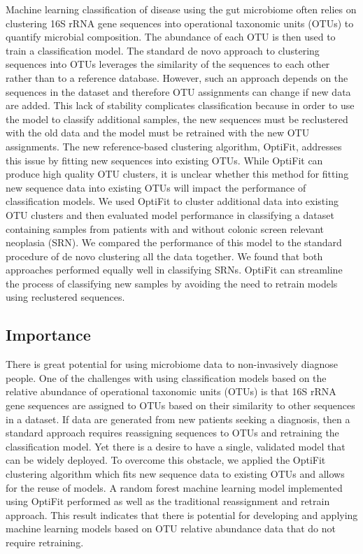 \documentclass[
]{article}
\begin{document}
Machine learning classification of disease using the gut microbiome
often relies on clustering 16S rRNA gene sequences into operational
taxonomic units (OTUs) to quantify microbial composition. The abundance
of each OTU is then used to train a classification model. The standard
de novo approach to clustering sequences into OTUs leverages the
similarity of the sequences to each other rather than to a reference
database. However, such an approach depends on the sequences in the
dataset and therefore OTU assignments can change if new data are added.
This lack of stability complicates classification because in order to
use the model to classify additional samples, the new sequences must be
reclustered with the old data and the model must be retrained with the
new OTU assignments. The new reference-based clustering algorithm,
OptiFit, addresses this issue by fitting new sequences into existing
OTUs. While OptiFit can produce high quality OTU clusters, it is unclear
whether this method for fitting new sequence data into existing OTUs
will impact the performance of classification models. We used OptiFit to
cluster additional data into existing OTU clusters and then evaluated
model performance in classifying a dataset containing samples from
patients with and without colonic screen relevant neoplasia (SRN). We
compared the performance of this model to the standard procedure of de
novo clustering all the data together. We found that both approaches
performed equally well in classifying SRNs. OptiFit can streamline the
process of classifying new samples by avoiding the need to retrain
models using reclustered sequences.

\hypertarget{importance}{%
\subsection{Importance}\label{importance}}

There is great potential for using microbiome data to non-invasively
diagnose people. One of the challenges with using classification models
based on the relative abundance of operational taxonomic units (OTUs) is
that 16S rRNA gene sequences are assigned to OTUs based on their
similarity to other sequences in a dataset. If data are generated from
new patients seeking a diagnosis, then a standard approach requires
reassigning sequences to OTUs and retraining the classification model.
Yet there is a desire to have a single, validated model that can be
widely deployed. To overcome this obstacle, we applied the OptiFit
clustering algorithm which fits new sequence data to existing OTUs and
allows for the reuse of models. A random forest machine learning model
implemented using OptiFit performed as well as the traditional
reassignment and retrain approach. This result indicates that there is
potential for developing and applying machine learning models based on
OTU relative abundance data that do not require retraining.
\end{document}
